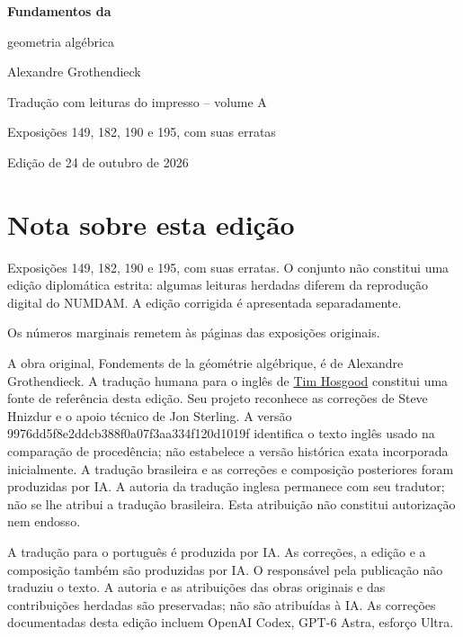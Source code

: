 \documentclass[11pt,twoside,openany]{book}
\numberwithin{equation}{section}
\theoremstyle{plain}
\theoremstyle{definition}
\theoremstyle{remark}
\begin{document}
\frontmatter
\begin{titlepage}
\centering
\vspace*{0.13\textheight}
{\Huge\bfseries Fundamentos da\par geometria algébrica\par}
\vspace{1.5\baselineskip}
{\Large Alexandre Grothendieck\par}
\vfill
{\Large Tradução com leituras do impresso -- volume A\par}
\vspace{\baselineskip}
{\large Exposições 149, 182, 190 e 195, com suas erratas\par}
\vspace{1.5\baselineskip}
{\normalsize Edição de 24 de outubro de 2026\par}
\end{titlepage}
\chapter*{Nota sobre esta edição}
Exposições 149, 182, 190 e 195, com suas erratas. O conjunto não constitui uma edição diplomática estrita: algumas leituras herdadas diferem da reprodução digital do NUMDAM. A edição corrigida é apresentada separadamente.

Os números marginais remetem às páginas das exposições originais.

A obra original, Fondements de la géométrie algébrique, é de Alexandre Grothendieck. A tradução humana para o inglês de \href{https://github.com/thosgood/fga/tree/9976dd5f8e2ddcb388f0a07f3aa334f120d1019f}{Tim Hosgood} constitui uma fonte de referência desta edição. Seu projeto reconhece as correções de Steve Hnizdur e o apoio técnico de Jon Sterling. A versão 9976dd5f8e2ddcb388f0a07f3aa334f120d1019f identifica o texto inglês usado na comparação de procedência; não estabelece a versão histórica exata incorporada inicialmente. A tradução brasileira e as correções e composição posteriores foram produzidas por IA. A autoria da tradução inglesa permanece com seu tradutor; não se lhe atribui a tradução brasileira. Esta atribuição não constitui autorização nem endosso.

A tradução para o português é produzida por IA. As correções, a edição e a composição também são produzidas por IA. O responsável pela publicação não traduziu o texto. A autoria e as atribuições das obras originais e das contribuições herdadas são preservadas; não são atribuídas à IA. As correções documentadas desta edição incluem OpenAI Codex, GPT-6 Astra, esforço Ultra.
\end{document}

